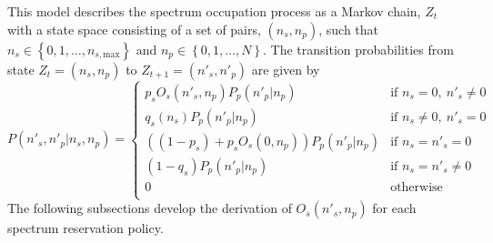This model describes the spectrum occupation process as a Markov chain, $Z_{t}$ with a state space consisting of a set of pairs, $\left(n_{s},n_{p}\right)$, such that $n_{s} \in \left\{0,1,\dots,n_{s,\text{max}}\right\}$ and $n_{p} \in \left\{0,1,\dots,N\right\}$. 
The transition probabilities from state $Z_{t}=\left(n_{s},n_{p}\right)$ to $Z_{t+1}=\left(n'_{s},n'_{p}\right)$ are given by
\begin{equation}\label{TransitionProbabilities}
P\left(n'_{s},n'_{p}|n_{s},n_{p}\right) = 
\begin{cases}
p_{s}O_{s}\left(n'_{s},n_{p}\right)P_{p}\left(n'_{p}|n_{p}\right)&\mbox{if } n_{s}=0,\:n'_{s}\neq0\\
q_{s}\left(n_{s}\right)P_{p}\left(n'_{p}|n_{p}\right)&\mbox{if } n_{s}\neq0,\:n'_{s} = 0\\
\left(\left(1-p_{s}\right) + p_{s}O_{s}\left(0,n_{p}\right)\right)P_{p}\left(n'_{p}|n_{p}\right)&\mbox{if } n_{s}=n'_{s}=0\\
\left(1-q_{s}\right)P_{p}\left(n'_{p}|n_{p}\right)&\mbox{if } n_{s}=n'_{s}\neq0\\
0&\mbox{otherwise}\\
\end{cases}
\end{equation}
The following subsections develop the derivation of $O_{s}\left(n'_{s},n_{p}\right)$ for each spectrum reservation policy.

